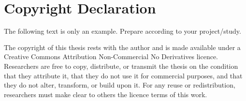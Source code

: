 \cleardoublepage{}
{}\mtcaddchapter 
\chapter*{Copyright Declaration}
\addtocounter{counter}{-1}


{\color{red}The following text is only an example. Prepare according to your project/study.}
\medskip

The copyright of this thesis rests with the author and is made available under a Creative Commons Attribution Non-Commercial No Derivatives licence. Researchers are free to copy, distribute, or transmit the thesis on the condition that they attribute it, that they do not use it for commercial purposes, and that they do not alter, transform, or build upon it. For any reuse or redistribution, researchers must make clear to others the licence terms of this work.